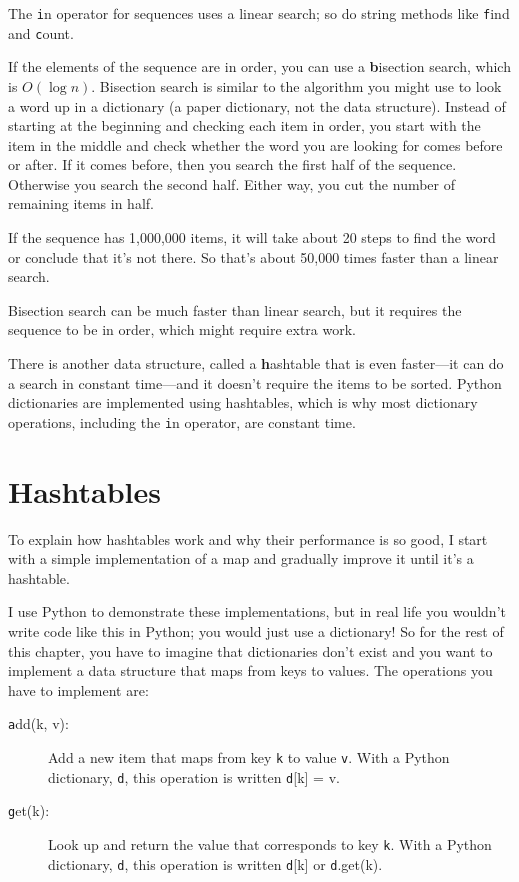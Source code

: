 \documentclass[
DIV=11,
fontsize=12,
twoside,
headinclude=false,
titlepage=firstiscover,
abstract=true,
headsepline=true,
footsepline=true,
chapterprefix=true, %
headings=big,
bibliography=totoc,%
captions=tableheading
]{scrbook}
\theoremstyle{definition}
\begin{document}
The {\texttt in} operator for sequences uses a linear search; so do string
methods like {\texttt find} and {\texttt count}.

If the elements of the sequence are in order, you can use a {\textbf
  bisection search}, which is $O(\log n)$.  Bisection search is
similar to the algorithm you might use to look a word up in a
dictionary (a paper dictionary, not the data structure).  Instead of
starting at the beginning and checking each item in order, you start
with the item in the middle and check whether the word you are looking
for comes before or after.  If it comes before, then you search the
first half of the sequence.  Otherwise you search the second half.
Either way, you cut the number of remaining items in half.

If the sequence has 1,000,000 items, it will take about 20 steps to
find the word or conclude that it's not there.  So that's about 50,000
times faster than a linear search.

Bisection search can be much faster than linear search, but
it requires the sequence to be in order, which might require
extra work.

There is another data structure, called a {\textbf hashtable} that
is even faster---it can do a search in constant time---and it
doesn't require the items to be sorted.  Python dictionaries
are implemented using hashtables, which is why most dictionary
operations, including the {\texttt in} operator, are constant time.


\section{Hashtables}
\label{hashtable}

To explain how hashtables work and why their performance is so
good, I start with a simple implementation of a map and
gradually improve it until it's a hashtable.

I use Python to demonstrate these implementations, but in real
life you wouldn't write code like this in Python; you would just use a
dictionary!  So for the rest of this chapter, you have to imagine that
dictionaries don't exist and you want to implement a data structure
that maps from keys to values.  The operations you have to
implement are:

\begin{description}

\item[{\texttt add(k, v)}:] Add a new item that maps from key {\texttt k}
to value {\texttt v}.  With a Python dictionary, {\texttt d}, this operation
is written {\texttt d[k] = v}.

\item[{\texttt get(k)}:] Look up and return the value that corresponds
to key {\texttt k}.  With a Python dictionary, {\texttt d}, this operation
is written {\texttt d[k]} or {\texttt d.get(k)}.

\end{description}
\end{document}
